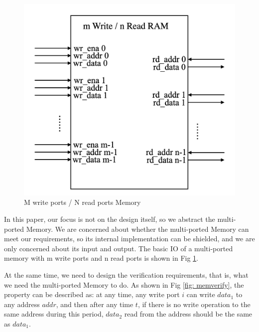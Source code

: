 \documentclass[conference]{IEEEtran}
\theoremstyle{definition}
\begin{document}
\begin{figure}[!htbp]
    \begin{center}
    \includegraphics[width=0.9\linewidth]{pics/mpmemoryio.png}
    \caption{M write ports / N read ports Memory}
    \label{fig: mpmemoryio}
    \end{center}
\end{figure}

In this paper, our focus is not on the design itself, so we abstract the multi-ported Memory. We are concerned about whether the multi-ported Memory can meet our requirements, so its internal implementation can be shielded, and we are only concerned about its input and output. The basic IO of a multi-ported memory with m write ports and n read ports is shown in Fig \ref{fig: mpmemoryio}.

At the same time, we need to design the verification requirements, that is, what we need the multi-ported Memory to do. As shown in Fig \ref{fig: memverify}, the property can be described as: at any time, any write port $i$ can write $data_1$ to any address $addr$, and then after any time $t$, if there is no write operation to the same address during this period, $data_2$ read from the address should be the same as $data_1$.
\end{document}
